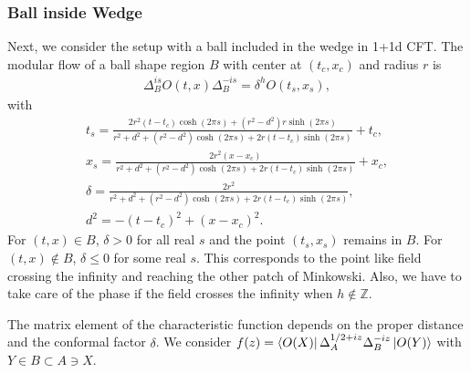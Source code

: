 \documentclass[a4paper,11pt]{article}
\theoremstyle{definition}
\begin{document}
\subsubsection{Ball inside Wedge}
Next, we consider the setup with a ball included in the wedge in 1+1d CFT. The modular flow of a ball shape region $B$ with center at $(t_c,x_c)$ and radius $r$ is
\begin{align}
    \Delta_B^{is} O(t,x) \Delta_B^{-is} = \delta^h O(t_s,x_s),
\end{align}
with
\begin{gather}
    t_s = \frac{2r^2(t-t_c) \cosh(2\pi s) + (r^2-d^2)r \sinh(2\pi s)}{r^2+d^2 + (r^2-d^2)\cosh(2\pi s) +2r(t-t_c)\sinh(2\pi s)} + t_c,\\
    x_s = \frac{2r^2(x-x_c)}{r^2+d^2 + (r^2-d^2)\cosh(2\pi s) +2r(t-t_c)\sinh(2\pi s)} + x_c,\\
    \delta = \frac{2r^2}{r^2+d^2 + (r^2-d^2)\cosh(2\pi s) +2r(t-t_c)\sinh(2\pi s)}, \\
    d^2 = -(t-t_c)^2 + (x-x_c)^2.
\end{gather}
For $(t,x) \in B$, $\delta>0$ for all real $s$ and the point $(t_s,x_s)$ remains in $B$. For $(t,x) \notin B$, $\delta\leq 0$ for some real $s$. This corresponds to the point like field crossing the infinity and reaching the other patch of Minkowski. Also, we have to take care of the phase if the field crosses the infinity when $h\notin\mathbb{Z}$.

The matrix element of the characteristic function depends on the proper distance and the conformal factor $\delta$. We consider $f(z)=\bra{O(X)}\Delta_A^{1/2+iz}\Delta_B^{-iz}\ket{O(Y)}$ with $Y\in B \subset A\ni X$.
\end{document}

